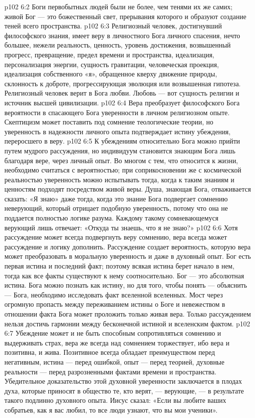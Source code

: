 \vs p102 6:2 Боги первобытных людей были не более, чем тенями их же самих; живой Бог --- это божественный свет, прерывания которого и образуют создание теней всего пространства.
\vs p102 6:3 \pc Религиозный человек, достигнувший философского знания, имеет веру в личностного Бога личного спасения, нечто большее, нежели реальность, ценность, уровень достижения, возвышенный прогресс, превращение, предел времени и пространства, идеализация, персонализация энергии, сущность гравитации, человеческая проекция, идеализация собственного «я», обращенное кверху движение природы, склонность к доброте, прогрессирующая эволюция или возвышенная гипотеза. Религиозный человек верит в Бога любви. Любовь --- вот сущность религии и источник высшей цивилизации.
\vs p102 6:4 Вера преобразует философского Бога вероятности в спасающего Бога уверенности в личном религиозном опыте. Скептицизм может поставить под сомнение теологические теории, но уверенность в надежности личного опыта подтверждает истину убеждения, переросшего в веру.
\vs p102 6:5 К убеждениям относительно Бога можно прийти путем мудрого рассуждения, но индивидуум становится знающим Бога лишь благодаря вере, через личный опыт. Во многом с тем, что относится к жизни, необходимо считаться с вероятностью; при соприкосновении же с космической реальностью уверенность можно испытывать тогда, когда к таким знаниям и ценностям подходят посредством живой веры. Душа, знающая Бога, отваживается сказать: «Я знаю» даже тогда, когда это знание Бога подвергает сомнению неверующий, который отрицает подобную уверенность, потому что она не поддается полностью логике разума. Каждому такому сомневающемуся верующий лишь отвечает: «Откуда ты знаешь, что я не знаю?»
\vs p102 6:6 \pc Хотя рассуждение может всегда подвергнуть веру сомнению, вера всегда может рассуждение и логику дополнить. Рассуждение создает вероятность, которую вера может преобразовать в моральную уверенность и даже в духовный опыт. Бог есть первая истина и последний факт; поэтому всякая истина берет начало в нем, тогда как все факты существуют к нему соотносительно. Бог --- это абсолютная истина. Бога можно познать как истину, но для того, чтобы понять --- объяснить --- Бога, необходимо исследовать факт вселенной вселенных. Мост через огромную пропасть между переживанием истины о Боге и невежеством в отношении факта Бога может проложить только живая вера. Только рассуждением нельзя достичь гармонии между бесконечной истиной и вселенским фактом.
\vs p102 6:7 Убеждение может и не быть способным сопротивляться сомнению и выдерживать страх, вера же всегда над сомнением торжествует, ибо вера и позитивна, и жива. Позитивное всегда обладает преимуществом перед негативным, истина --- перед ошибкой, опыт --- перед теорией, духовные реальности --- перед разрозненными фактами времени и пространства. Убедительное доказательство этой духовной уверенности заключается в плодах духа, которые приносят в общество те, кто верят, --- верующие, --- в результате такого подлинно духовного опыта. Иисус сказал: «Если вы любите ваших собратьев, как я вас любил, то все люди узнают, что вы мои ученики».
